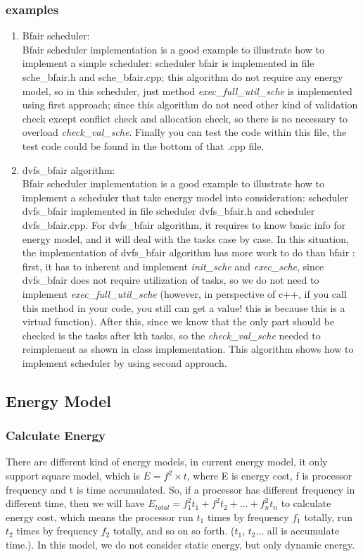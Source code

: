 \documentclass[11pt, oneside]{article}
\begin{document}
\subsubsection{examples}
\begin{enumerate}
\item Bfair scheduler: \\
Bfair scheduler implementation is a good example to illustrate how to implement a simple scheduler: scheduler bfair is implemented in file sche\_bfair.h and sche\_bfair.cpp; this algorithm do not require any energy model, so in this scheduler, just method \textit{exec\_full\_util\_sche} is implemented using first approach; since this algorithm do not need other kind of validation check except conflict check and allocation check, so there is no necessary to overload \textit{check\_val\_sche}. Finally you can test the code within this file, the test code could be found in the bottom of that .cpp file.
\item dvfs\_bfair algorithm:\\
Bfair scheduler implementation is a good example to illustrate how to implement a scheduler that take energy model into consideration: scheduler dvfs\_bfair implemented in file scheduler dvfs\_bfair.h and scheduler dvfs\_bfair.cpp. For dvfs\_bfair algorithm, it requires to know basic info for energy model, and it will deal with the tasks case by case. In this situation, the implementation of dvfs\_bfair algorithm has more work to do than bfair : first, it has to inherent and implement \textit{init\_sche} and \textit{exec\_sche}, since dvfs\_bfair does not require utilization of tasks, so we do not need to implement \textit{exec\_full\_util\_sche} (however, in perspective of c++, if you call this method in your code, you still can get a value! this is because this is a virtual function). After this, since we know that the only part should be checked is the tasks after kth tasks, so the \textit{check\_val\_sche} needed to reimplement as shown in class implementation. This algorithm shows how to implement scheduler by using second approach.
\end{enumerate}

\subsection{Energy Model}
\subsubsection{Calculate Energy}
There are different kind of energy models, in current energy model, it only support square model, which is $E = f^2\times t$, where E is energy cost, f is processor frequency and t is time accumulated. So, if a processor has different frequency in different time, then we will have $E_{total} = f_1^2t_1 + f^2t_2 + ... + f_n^2t_n$ to calculate energy cost, which means the processor run $t_1$ times by frequency $f_1$ totally, run $t_2$ times by frequency $f_2$ totally, and so on so forth. ($t_1$, $t_2$... all is accumulate time.). In this model, we do not consider static energy, but only dynamic energy.
\end{document}
